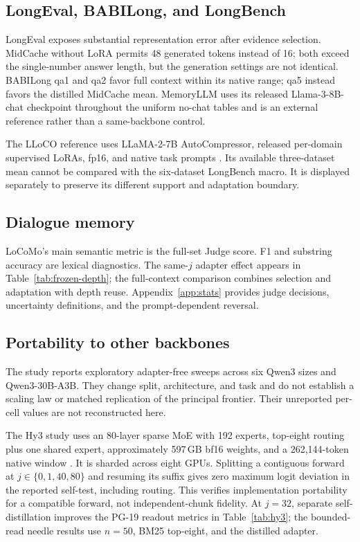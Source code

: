 \subsection{LongEval, BABILong, and LongBench}



LongEval exposes substantial representation error after evidence selection. MidCache without LoRA permits 48 generated tokens instead of 16; both exceed the single-number answer length, but the generation settings are not identical. BABILong qa1 and qa2 favor full context within its native range; qa5 instead favors the distilled MidCache mean. MemoryLLM uses its released Llama-3-8B-chat checkpoint throughout the uniform no-chat tables and is an external reference rather than a same-backbone control.

The LLoCO reference uses LLaMA-2-7B AutoCompressor, released per-domain supervised LoRAs, fp16, and native task prompts \citep{lloco}. Its available three-dataset mean cannot be compared with the six-dataset LongBench macro. It is displayed separately to preserve its different support and adaptation boundary.

\subsection{Dialogue memory}


LoCoMo's main semantic metric is the full-set Judge score. F1 and substring accuracy are lexical diagnostics. The same-$j$ adapter effect appears in Table~\ref{tab:frozen-depth}; the full-context comparison combines selection and adaptation with depth reuse. Appendix~\ref{app:stats} provides judge decisions, uncertainty definitions, and the prompt-dependent reversal.

\subsection{Portability to other backbones}

The study reports exploratory adapter-free sweeps across six Qwen3 sizes and Qwen3-30B-A3B. They change split, architecture, and task and do not establish a scaling law or matched replication of the principal frontier. Their unreported per-cell values are not reconstructed here.

The Hy3 study uses an 80-layer sparse MoE with 192 experts, top-eight routing plus one shared expert, approximately 597\,GB bf16 weights, and a 262,144-token native window \citep{hunyuan}. It is sharded across eight GPUs. Splitting a contiguous forward at $j\in\{0,1,40,80\}$ and resuming its suffix gives zero maximum logit deviation in the reported self-test, including routing. This verifies implementation portability for a compatible forward, not independent-chunk fidelity. At $j=32$, separate self-distillation improves the PG-19 readout metrics in Table~\ref{tab:hy3}; the bounded-read needle results use $n=50$, BM25 top-eight, and the distilled adapter.
